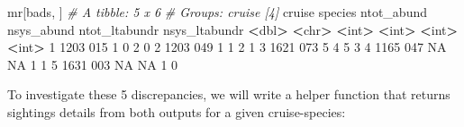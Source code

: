 \documentclass[
]{book}
\newenvironment{Shaded}{\begin{snugshade}}{\end{snugshade}}
\newcommand{\CommentTok}[1]{\textcolor[rgb]{0.56,0.35,0.01}{\textit{#1}}}
\newcommand{\ConstantTok}[1]{\textcolor[rgb]{0.56,0.35,0.01}{#1}}
\newcommand{\DecValTok}[1]{\textcolor[rgb]{0.00,0.00,0.81}{#1}}
\newcommand{\ErrorTok}[1]{\textcolor[rgb]{0.64,0.00,0.00}{\textbf{#1}}}
\newcommand{\NormalTok}[1]{#1}
\newcommand{\SpecialCharTok}[1]{\textcolor[rgb]{0.81,0.36,0.00}{\textbf{#1}}}
\begin{document}
\begin{Shaded}
\begin{Highlighting}[]
\NormalTok{mr[bads, ]}
\CommentTok{\# A tibble: 5 x 6}
\CommentTok{\# Groups:   cruise [4]}
\NormalTok{  cruise species ntot\_abund nsys\_abund ntot\_ltabundr nsys\_ltabundr}
   \SpecialCharTok{\textless{}}\NormalTok{dbl}\SpecialCharTok{\textgreater{}} \ErrorTok{\textless{}}\NormalTok{chr}\SpecialCharTok{\textgreater{}}        \ErrorTok{\textless{}}\NormalTok{int}\SpecialCharTok{\textgreater{}}      \ErrorTok{\textless{}}\NormalTok{int}\SpecialCharTok{\textgreater{}}         \ErrorTok{\textless{}}\NormalTok{int}\SpecialCharTok{\textgreater{}}         \ErrorTok{\textless{}}\NormalTok{int}\SpecialCharTok{\textgreater{}}
\DecValTok{1}   \DecValTok{1203} \DecValTok{015}              \DecValTok{1}          \DecValTok{0}             \DecValTok{2}             \DecValTok{0}
\DecValTok{2}   \DecValTok{1203} \DecValTok{049}              \DecValTok{1}          \DecValTok{1}             \DecValTok{2}             \DecValTok{1}
\DecValTok{3}   \DecValTok{1621} \DecValTok{073}              \DecValTok{5}          \DecValTok{4}             \DecValTok{5}             \DecValTok{3}
\DecValTok{4}   \DecValTok{1165} \DecValTok{047}             \ConstantTok{NA}         \ConstantTok{NA}             \DecValTok{1}             \DecValTok{1}
\DecValTok{5}   \DecValTok{1631} \DecValTok{003}             \ConstantTok{NA}         \ConstantTok{NA}             \DecValTok{1}             \DecValTok{0}
\end{Highlighting}
\end{Shaded}

To investigate these 5 discrepancies, we will write a helper function that returns sightings details from both outputs for a given cruise-species:
\end{document}
